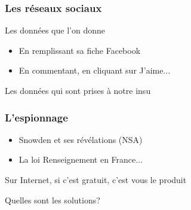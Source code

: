 \documentclass{beamer}
\begin{document}
\begin{frame}
\frametitle{Les réseaux sociaux}
\begin{block}{Les données que l'on donne}
\begin{itemize}
\item En remplissant sa fiche Facebook
\item En commentant, en cliquant sur J'aime...
\end{itemize}
\end{block}

\begin{block}{Les données qui sont prises à notre insu}
\begin{itemize}
\end{itemize}
\end{block}
\end{frame}

\begin{frame}
\frametitle{L'espionnage}
\begin{itemize}
\item Snowden et ses révélations (NSA)
\item La loi Renseignement en France...
\end{itemize}
\end{frame}

\begin{frame}
\begin{center}
\Huge{Sur Internet, si c'est gratuit, c'est vous le produit }
\end{center}
\end{frame}

\begin{frame}
\begin{center}
\Huge{Quelles sont les solutions?}
\end{center}
\end{frame}
\end{document}
